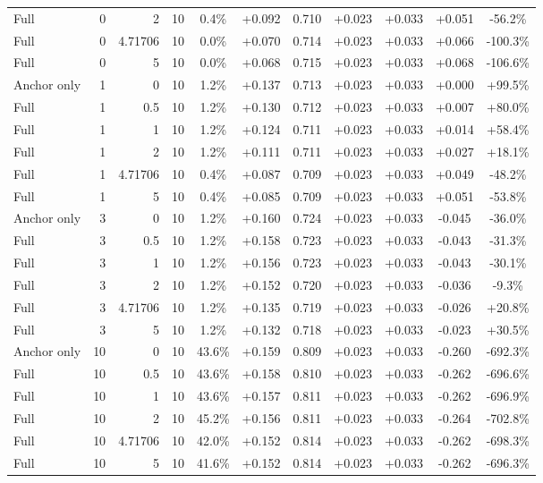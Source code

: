 \begin{table}[htbp]
\begin{tabular}{lrrrccccccc}
Full & 0 & 2 & 10 & 0.4\% & +0.092 & 0.710 & +0.023 & +0.033 & +0.051 & -56.2\% \\
Full & 0 & 4.71706 & 10 & 0.0\% & +0.070 & 0.714 & +0.023 & +0.033 & +0.066 & -100.3\% \\
Full & 0 & 5 & 10 & 0.0\% & +0.068 & 0.715 & +0.023 & +0.033 & +0.068 & -106.6\% \\
Anchor only & 1 & 0 & 10 & 1.2\% & +0.137 & 0.713 & +0.023 & +0.033 & +0.000 & +99.5\% \\
Full & 1 & 0.5 & 10 & 1.2\% & +0.130 & 0.712 & +0.023 & +0.033 & +0.007 & +80.0\% \\
Full & 1 & 1 & 10 & 1.2\% & +0.124 & 0.711 & +0.023 & +0.033 & +0.014 & +58.4\% \\
Full & 1 & 2 & 10 & 1.2\% & +0.111 & 0.711 & +0.023 & +0.033 & +0.027 & +18.1\% \\
Full & 1 & 4.71706 & 10 & 0.4\% & +0.087 & 0.709 & +0.023 & +0.033 & +0.049 & -48.2\% \\
Full & 1 & 5 & 10 & 0.4\% & +0.085 & 0.709 & +0.023 & +0.033 & +0.051 & -53.8\% \\
Anchor only & 3 & 0 & 10 & 1.2\% & +0.160 & 0.724 & +0.023 & +0.033 & -0.045 & -36.0\% \\
Full & 3 & 0.5 & 10 & 1.2\% & +0.158 & 0.723 & +0.023 & +0.033 & -0.043 & -31.3\% \\
Full & 3 & 1 & 10 & 1.2\% & +0.156 & 0.723 & +0.023 & +0.033 & -0.043 & -30.1\% \\
Full & 3 & 2 & 10 & 1.2\% & +0.152 & 0.720 & +0.023 & +0.033 & -0.036 & -9.3\% \\
Full & 3 & 4.71706 & 10 & 1.2\% & +0.135 & 0.719 & +0.023 & +0.033 & -0.026 & +20.8\% \\
Full & 3 & 5 & 10 & 1.2\% & +0.132 & 0.718 & +0.023 & +0.033 & -0.023 & +30.5\% \\
Anchor only & 10 & 0 & 10 & 43.6\% & +0.159 & 0.809 & +0.023 & +0.033 & -0.260 & -692.3\% \\
Full & 10 & 0.5 & 10 & 43.6\% & +0.158 & 0.810 & +0.023 & +0.033 & -0.262 & -696.6\% \\
Full & 10 & 1 & 10 & 43.6\% & +0.157 & 0.811 & +0.023 & +0.033 & -0.262 & -696.9\% \\
Full & 10 & 2 & 10 & 45.2\% & +0.156 & 0.811 & +0.023 & +0.033 & -0.264 & -702.8\% \\
Full & 10 & 4.71706 & 10 & 42.0\% & +0.152 & 0.814 & +0.023 & +0.033 & -0.262 & -698.3\% \\
Full & 10 & 5 & 10 & 41.6\% & +0.152 & 0.814 & +0.023 & +0.033 & -0.262 & -696.3\% \\

\end{tabular}
\end{table}
